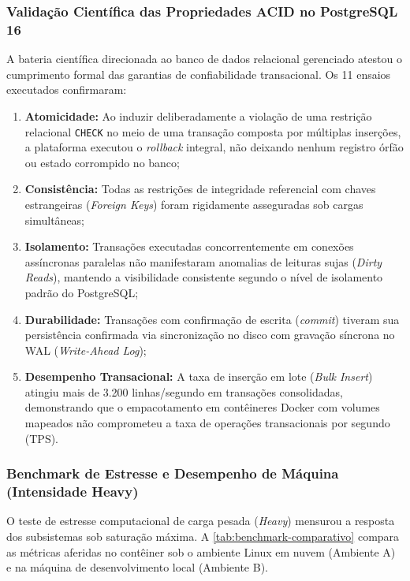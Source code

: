 \subsubsection{Validação Científica das Propriedades ACID no PostgreSQL 16}

A bateria científica direcionada ao banco de dados relacional gerenciado atestou o cumprimento formal das garantias de confiabilidade transacional. Os 11 ensaios executados confirmaram:
\begin{enumerate}
    \item \textbf{Atomicidade:} Ao induzir deliberadamente a violação de uma restrição relacional \texttt{CHECK} no meio de uma transação composta por múltiplas inserções, a plataforma executou o \textit{rollback} integral, não deixando nenhum registro órfão ou estado corrompido no banco;
    \item \textbf{Consistência:} Todas as restrições de integridade referencial com chaves estrangeiras (\textit{Foreign Keys}) foram rigidamente asseguradas sob cargas simultâneas;
    \item \textbf{Isolamento:} Transações executadas concorrentemente em conexões assíncronas paralelas não manifestaram anomalias de leituras sujas (\textit{Dirty Reads}), mantendo a visibilidade consistente segundo o nível de isolamento padrão do PostgreSQL;
    \item \textbf{Durabilidade:} Transações com confirmação de escrita (\textit{commit}) tiveram sua persistência confirmada via sincronização no disco com gravação síncrona no WAL (\textit{Write-Ahead Log});
    \item \textbf{Desempenho Transacional:} A taxa de inserção em lote (\textit{Bulk Insert}) atingiu mais de 3.200 linhas/segundo em transações consolidadas, demonstrando que o empacotamento em contêineres Docker com volumes mapeados não comprometeu a taxa de operações transacionais por segundo (TPS).
\end{enumerate}

\subsubsection{Benchmark de Estresse e Desempenho de Máquina (Intensidade Heavy)}

O teste de estresse computacional de carga pesada (\textit{Heavy}) mensurou a resposta dos subsistemas sob saturação máxima. A \autoref{tab:benchmark-comparativo} compara as métricas aferidas no contêiner sob o ambiente Linux em nuvem (Ambiente A) e na máquina de desenvolvimento local (Ambiente B).


